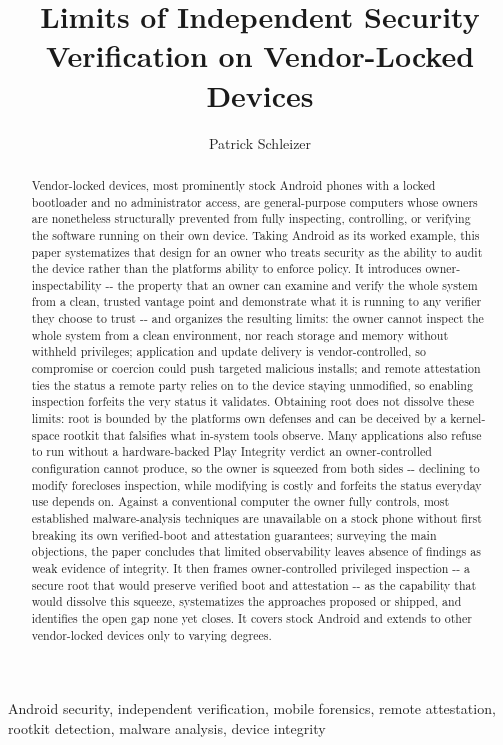 \documentclass[
  journal]{IEEEtran}
\author{}
\date{}
\title{Limits of Independent Security Verification on Vendor-Locked Devices}
\author{Patrick Schleizer}
\begin{document}
\maketitle
\begin{abstract}
Vendor-locked devices, most prominently stock Android phones with a
locked bootloader and no administrator access, are general-purpose
computers whose owners are nonetheless structurally prevented from fully
inspecting, controlling, or verifying the software running on their own
device. Taking Android as its worked example, this paper systematizes
that design for an owner who treats security as the ability to audit the
device rather than the platform\textquotesingle s ability to enforce
policy. It introduces owner-inspectability -\/- the property that an
owner can examine and verify the whole system from a clean, trusted
vantage point and demonstrate what it is running to any verifier they
choose to trust -\/- and organizes the resulting limits: the owner
cannot inspect the whole system from a clean environment, nor reach
storage and memory without withheld privileges; application and update
delivery is vendor-controlled, so compromise or coercion could push
targeted malicious installs; and remote attestation ties the status a
remote party relies on to the device staying unmodified, so enabling
inspection forfeits the very status it validates. Obtaining root does
not dissolve these limits: root is bounded by the
platform\textquotesingle s own defenses and can be deceived by a
kernel-space rootkit that falsifies what in-system tools observe. Many
applications also refuse to run without a hardware-backed Play Integrity
verdict an owner-controlled configuration cannot produce, so the owner
is squeezed from both sides -\/- declining to modify forecloses
inspection, while modifying is costly and forfeits the status everyday
use depends on. Against a conventional computer the owner fully
controls, most established malware-analysis techniques are unavailable
on a stock phone without first breaking its own verified-boot and
attestation guarantees; surveying the main objections, the paper
concludes that limited observability leaves absence of findings as weak
evidence of integrity. It then frames owner-controlled privileged
inspection -\/- a secure root that would preserve verified boot and
attestation -\/- as the capability that would dissolve this squeeze,
systematizes the approaches proposed or shipped, and identifies the open
gap none yet closes. It covers stock Android and extends to other
vendor-locked devices only to varying degrees.
\end{abstract}
\begin{IEEEkeywords}
Android security, independent verification, mobile forensics, remote attestation, rootkit detection, malware analysis, device integrity
\end{IEEEkeywords}
\end{document}

